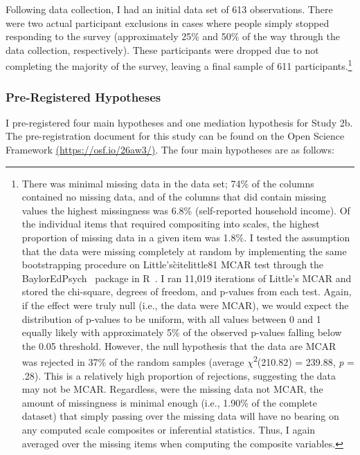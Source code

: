 \documentclass{sfuthesis}
\begin{document}
Following data collection, I had an initial data set of 613 observations. There were two actual participant exclusions in cases where people simply stopped responding to the survey (approximately 25\% and 50\% of the way through the data collection, respectively). These participants were dropped due to not completing the majority of the survey, leaving a final sample of 611 participants.\footnote{There was minimal missing data in the data set; 74\% of the columns contained no missing data, and of the columns that did contain missing values the highest missingness was 6.8\% (self-reported household income). Of the individual items that required compositing into scales, the highest proportion of missing data in a given item was 1.8\%. I tested the assumption that the data were missing completely at random by implementing the same bootstrapping procedure on Little’s\`cite{little81} MCAR test through the BaylorEdPsych~\cite{baylor} package in R~\cite{rcore}. I ran 11,019 iterations of Little’s MCAR and stored the chi-square, degrees of freedom, and p-values from each test. Again, if the effect were truly null (i.e., the data were MCAR), we would expect the distribution of p-values to be uniform, with all values between 0 and 1 equally likely with approximately 5\% of the observed p-values falling below the 0.05 threshold. However, the null hypothesis that the data are MCAR was rejected in 37\% of the random samples (average $\chi$\textsuperscript{2}(210.82) = 239.88, \textit{p} = .28). This is a relatively high proportion of rejections, suggesting the data may not be MCAR. Regardless, were the missing data not MCAR, the amount of missingness is minimal enough (i.e., 1.90\% of the complete dataset) that simply passing over the missing data will have no bearing on any computed scale composites or inferential statistics. Thus, I again averaged over the missing items when computing the composite variables.} 

\subsubsection{Pre-Registered Hypotheses}

I pre-registered four main hypotheses and one mediation hypothesis for Study 2b. The pre-registration document for this study can be found on the Open Science Framework \href{https://osf.io/26aw3/}{(https://osf.io/26aw3/)}. The four main hypotheses are as follows:
\end{document}
